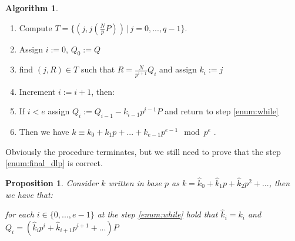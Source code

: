 \documentclass{article}
\theoremstyle{plain}
\newtheorem{prop}[teo]{Proposition}
\theoremstyle{remark}
\theoremstyle{definition}
\newtheorem{algo}[teo]{Algorithm}
\begin{document}
\begin{algo}\label{algo:ecdlp_naive}

	\begin{enumerate}
		\item \label{enum:store} Compute $T = \{ (j,j\left(\frac{N}{p}P\right)) \,|\, j = 0,...,q-1 \}$.
		\item Assign $i := 0$, $Q_0 := Q$
		\item \label{enum:while} find $(j,R)\in T$ such that $R = \frac{N}{p^{i+1}}Q_i$ and assign $k_i := j$
		\item Increment $i := i + 1$, then:
		\item \label{enum:if} If $i < e$ assign $Q_i := Q_{i-1} - k_{i-1} p^{i-1}P$ and return to step \ref{enum:while}
		\item Then we have $k \equiv k_0 + k_1p + ... + k_{e-1}p^{e-1} \mod p^e$ \label{enum:final_dlp}.
	\end{enumerate}

\end{algo}


Obviously the procedure terminates, but we still need to prove that the step \ref{enum:final_dlp} is correct.

\begin{prop}
	\label{prop:corr_dlp}
	Consider $k$ written in base $p$ as $k = \hat{k}_0 + \hat{k}_1p + \hat{k}_2p^2 + ...$, then we have that:

	for each $i \in \{0,...,e-1\}$ at the step \ref{enum:while} hold that 
	$\hat{k}_i = k_i$ and $Q_i = (\hat{k}_ip^i + \hat{k}_{i+1}p^{i+1} + ... )P$
\end{prop}
\end{document}
